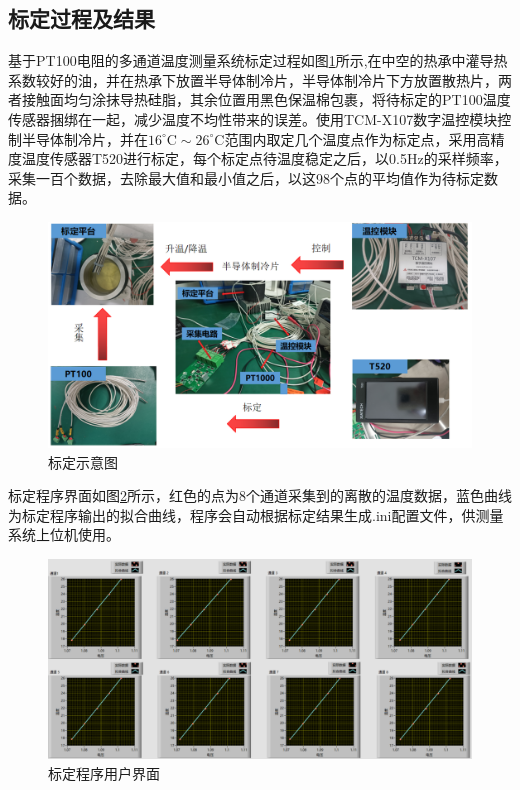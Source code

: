 \subsection{标定过程及结果}
基于PT100电阻的多通道温度测量系统标定过程如图\ref{fig:标定示意图}所示,在中空的热承中灌导热系数较好的油，并在热承下放置半导体制冷片，半导体制冷片下方放置散热片，两者接触面均匀涂抹导热硅脂，其余位置用黑色保温棉包裹，将待标定的PT100温度传感器捆绑在一起，减少温度不均性带来的误差。使用TCM-X107数字温控模块控制半导体制冷片，并在\(16^{\circ} \mathrm{C} \sim 26^{\circ} \mathrm{C}\)范围内取定几个温度点作为标定点，采用高精度温度传感器T520进行标定，每个标定点待温度稳定之后，以0.5Hz的采样频率，采集一百个数据，去除最大值和最小值之后，以这98个点的平均值作为待标定数据。
  \begin{figure}[htb]
    \centering
    \includegraphics[width=12cm]{fig/3-fig/温度测量系统标定示意图.jpg}
    \caption{标定示意图}
    \label{fig:标定示意图}
\end{figure}

标定程序界面如图\ref{fig:标定程序用户界面}所示，红色的点为8个通道采集到的离散的温度数据，蓝色曲线为标定程序输出的拟合曲线，程序会自动根据标定结果生成.ini配置文件，供测量系统上位机使用。
\begin{figure}[htb]
    \centering
    \includegraphics[width=12cm]{fig/3-fig/标定程序前面板.jpg}
    \caption{标定程序用户界面}
    \label{fig:标定程序用户界面}
\end{figure}

